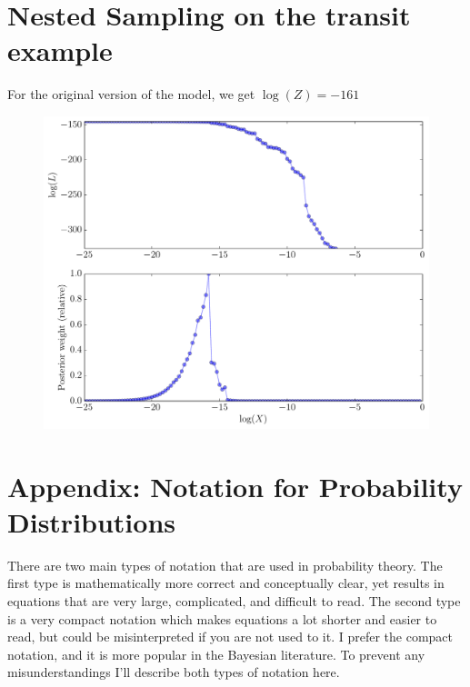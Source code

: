 \section{Nested Sampling on the transit example}\label{sec:model_selection}
For the original version of the model, we get
$\log(Z) = -161$



\begin{figure}
\begin{center}
\includegraphics[scale=0.45]{ns_output.pdf}
\caption{\it \label{fig:ns_output}}
\end{center}
\end{figure}



\section{Appendix: Notation for Probability Distributions}
There are two main types of notation that are used in probability theory. The
first type is mathematically more correct and conceptually
clear, yet results in equations that are very large, complicated,
and difficult to read.
The second type is a very compact notation which makes equations a lot
shorter and easier to read, but could be misinterpreted if you are not used to
it. I prefer the compact notation, and it is more popular in the Bayesian
literature. To prevent any misunderstandings I'll describe both types of
notation here.

